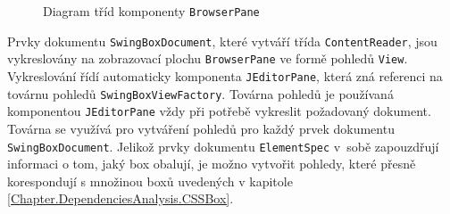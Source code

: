 \begin{figure}[H]
  \begin{center}
    \caption{Diagram tříd komponenty \texttt{BrowserPane}}
    \label{Figure.SwingBoxDesign}
  \end{center}
\end{figure}

Prvky dokumentu \texttt{SwingBoxDocument}, které vytváří třída \texttt{ContentReader}, jsou vykreslovány na zobrazovací plochu \texttt{BrowserPane} ve formě pohledů \texttt{View}. Vykreslování řídí automaticky komponenta \texttt{JEditorPane}, která zná referenci na továrnu pohledů \linebreak\texttt{SwingBoxViewFactory}. Továrna pohledů je používaná komponentou \texttt{JEditorPane} vždy při potřebě vykreslit požadovaný dokument. Továrna se využívá pro vytváření pohledů pro každý prvek dokumentu \texttt{SwingBoxDocument}. Jelikož prvky dokumentu \texttt{ElementSpec} v~sobě zapouzdřují informaci o tom, jaký box obalují, je možno vytvořit pohledy, které přesně korespondují s množinou boxů uvedených v kapitole \ref{Chapter.DependenciesAnalysis.CSSBox}.

